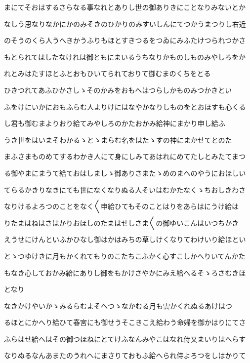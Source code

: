 \documentclass[a4paper,11pt,landscape]{ltjtarticle}
\begin{document}
\par\medskip
まにてそおはするさらなる事なれとありし世の御ありきにことなりみないとか
\par\medskip
なしう思なりなかにかのみそきのひかりのみすいしんにてつかうまつりし右近
\par\medskip
のそうのくら人うへきかうふりもほとすきつるをつゐにみふたけつられつかさ
\par\medskip
もとられてはしたなけれは御ともにまいるうちなりかものしものみやしろをか
\par\medskip
れとみはたすほとふとおもひいてられておりて御むまのくちをとる
\par\medskip
ひきつれてあふひかさしゝそのかみをおもへはつらしかものみつかきとい
\par\medskip
ふをけにいかにおもふらむ人よりけにはなやかなりしものをとおほすも心くる
\par\medskip
し君も御むまよりおり給てみやしろのかたおかみ給神にまかり申し給ふ
\par\medskip
うき世をはいまそわかるゝとゝまらむ名をはたゝすの神にまかせてとのた
\par\medskip
まふさまものめてするわかき人にて身にしみてあはれにめてたしとみたてまつ
\par\medskip
る御やまにまうて給ておはしましゝ御ありさまたゝめのまへのやうにおほしい
\par\medskip
てらるかきりなきにても世になくなりぬる人そいはむかたなくゝちおしきわさ
\par\medskip
なりけるよろつのことをなく〱申給ひてもそのことはりをあらはにうけ給は
\par\medskip
りたまはねはさはかりおほしのたまはせしさま〱の御ゆいこんはいつちかき
\par\medskip
えうせにけんといふかひなし御はかはみちの草しけくなりてわけいり給ほとい
\par\medskip
とゝつゆけきに月もかくれてもりのこたちこふかく心すこしかへりいてんかた
\par\medskip
もなき心しておかみ給にありし御をもかけさやかにみえ給へるそゝろさむきほ
\par\medskip
となり
\par\medskip
なきかけやいかゝみるらむよそへつゝなかむる月も雲かくれぬるあけはつ
\par\medskip
るほとにかへり給ひて春宮にも御せうそこきこえ給わう命婦を御かはりにてさ
\par\medskip
ふらはせ給へはその御つほねにとてけふなんみやこはなれ侍又まいりはへらす
\par\medskip
なりぬるなんあまたのうれへにまさりておもふ給へられ侍よろつをしはかりて
\end{document}
